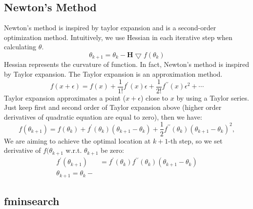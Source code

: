 \documentclass{llncs}
\begin{document}
\subsection{Newton's Method}
Newton's method is inspired by taylor expansion and is a second-order optimization method. Intuitively, we use Hessian in each iterative step when calculating $\theta$. 
\begin{equation}
   \theta_{k+1} = \theta_k - \bm{H} \bigtriangledown f(\theta_k)
\end{equation}
Hessian represents the curvature of function. In fact, Newton's method is inspired by Taylor expansion. The Taylor expansion is an approximation method.
\begin{equation}
    f(x+\epsilon) = f(x) + \frac{1}{1!}f^{\prime}(x)\epsilon + \frac{1}{2!}f^{\prime\prime}(x)\epsilon^2 + \cdots
\end{equation}
Taylor expansion approximates a point ($x+\epsilon$) close to $x$ by using a Taylor series. Just keep first and second order of Taylor expansion above (higher order derivatives of quadratic equation are equal to zero), then we have:
\begin{equation}
    f(\theta_{k+1}) = f(\theta_k) + f^{\prime}(\theta_k) (\theta_{k+1}-\theta_k) + \frac{1}{2}f^{\prime\prime}(\theta_k)(\theta_{k+1}-\theta_k)^2, 
\end{equation}
We are aiming to achieve the optimal location at $k+1$-th step, so we set derivative of $f(\theta_{k+1}$ w.r.t. $\theta_{k+1}$ be zero:
\begin{equation}
    \begin{aligned}
    f^\prime(\theta_{k+1}) &= f^{\prime}(\theta_k)f^{\prime\prime}(\theta_k)(\theta_{k+1}-\theta_k) \\
    \theta_{k+1} = \theta_k - 
    \end{aligned}
\end{equation}
\subsection{fminsearch}

%
\clearpage
{} %
\renewcommand{\indexname}{Author Index}
\clearpage
\end{document}
